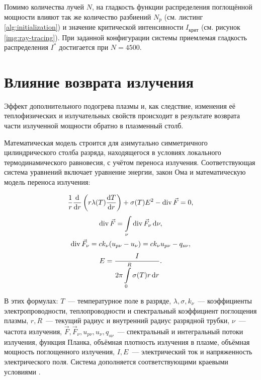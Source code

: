 Помимо количества лучей $N$, на гладкость функции распределения поглощённой мощности влияют так же количество разбиений $N_p$ (см. листинг \ref{alg:initialization}) и значение критической интенсивности $I_{\text{крит}}$ (см. рисунок \ref{img:ray-tracing}).
При заданной конфигурации системы приемлемая гладкость распределения $I^*$ достигается при $N = 4500$.

\pagebreak

\section{Влияние возврата излучения}

Эффект дополнительного подогрева плазмы и, как следствие, изменения её теплофизических и излучательных свойств происходит в результате возврата части излученной мощности обратно в плазменный столб.

Математическая модель строится для азимутально симметричного цилиндрического столба разряда, находящегося в условиях локального термодинамического равновесия, с учётом переноса излучения.
Соответствующая система уравнений включает уравнение энергии, закон Ома и математическую модель переноса излучения:

\begin{equation}
	\label{eqn:article-1}
	\frac1r\frac{\mathrm d}{\mathrm dr} \left( r \lambda(T) \frac{\mathrm dT}{\mathrm dr} \right) + \sigma(T)E^2 - \operatorname{div}{\vec F = 0},
\end{equation}
\begin{equation}
	\label{eqn:article-2}
	\begin{gathered}
		\operatorname{div}{\vec F} = \int\displaylimits_\nu \operatorname{div}{\vec F_\nu} \,\mathrm d\nu, \\
		\operatorname{div}{\vec F_\nu} = ck_{\nu}(u_{p\nu} - u_{\nu}) = ck_{\nu}u_{p\nu} - q_{s\nu}, \\
	\end{gathered}
\end{equation}
\begin{equation}
	\label{eqn:article-3}
	E = \frac{I}{\displaystyle 2\pi\int\displaylimits_0^R \sigma(T) r\,\mathrm dr}.
\end{equation}

В этих формулах: $T$~— температурное поле в разряде, $\lambda, \sigma, k_\nu$~— коэффициенты электропроводности, теплопроводности и спектральный коэффициент поглощения плазмы, $r, R$~— текущий радиус и внутренний радиус разрядной трубки, $\nu$~— частота излучения, $\vec F, \vec F_\nu, u_{p\nu}, u_{\nu}, q_{s\nu}$~— спектральный и  интегральный потоки излучения, функция Планка, объёмная плотность излучения в плазме, объёмная мощность поглощенного излучения, $I, E$~— электрический ток и напряженность электрического поля.
Система дополняется соответствующими краевыми условиями \cite{gradov-dissertation}.

